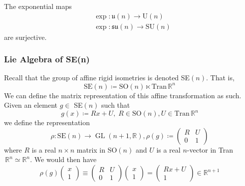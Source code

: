 \documentclass{article}
\DeclareMathOperator{\GL}{GL}
\newcounter{theorem}[section]
\begin{document}
    \begin{theorem}
      \label{thm:surjectivity-of-exp-for-the-unitary-groups}
    The exponential maps 
    \begin{align*}
      & \exp: \mathfrak{u}(n) \rightarrow \text{U}(n) \\
      & \exp: \mathfrak{su}(n) \rightarrow \text{SU}(n)
    \end{align*}
    are surjective. 
    \end{theorem}

  \subsubsection{Lie Algebra of SE(n)}

    Recall that the group of affine rigid isometries is denoted SE$(n)$. That is, 
    \begin{equation}
      \text{SE}(n) \coloneqq \text{SO}(n) \ltimes \text{Tran}\,\mathbb{R}^n
    \end{equation}
    We can define the matrix representation of this affine transformation as such. Given an element $g \in$ SE$(n)$ such that
    \begin{equation}
      g(x) \coloneqq R x + U, \; R \in \text{SO}(n), U \in \text{Tran}\, \mathbb{R}^n 
    \end{equation}
    we define the representation
    \begin{equation}
      \rho: \text{SE}(n) \rightarrow \GL(n+1, \mathbb{R}), \rho(g) \coloneqq \begin{pmatrix}
      R&U\\0&1
      \end{pmatrix}
    \end{equation}
    where $R$ is a real $n\times n$ matrix in SO$(n)$ and $U$ is a real $n$-vector in Tran$\,\mathbb{R}^n \simeq \mathbb{R}^n$. We would then have
    \begin{equation}
      \rho(g) \begin{pmatrix}
      x\\1
      \end{pmatrix} \equiv \begin{pmatrix}
      R&U\\0&1
      \end{pmatrix} \begin{pmatrix}
      x\\1
      \end{pmatrix} = \begin{pmatrix}
      R x + U\\1
      \end{pmatrix} \in \mathbb{R}^{n+1}
    \end{equation}
\end{document}

